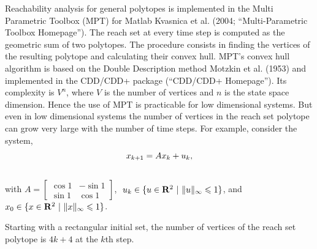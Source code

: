 \documentclass[letterpaper,10pt,english]{sphinxmanual}
\begin{document}
Reachability analysis for general polytopes is implemented in the Multi
Parametric Toolbox (MPT) for Matlab Kvasnica et al. (2004;
“Multi-Parametric Toolbox Homepage”). The reach set at every time step
is computed as the geometric sum of two polytopes. The procedure
consists in finding the vertices of the resulting polytope and
calculating their convex hull. MPT’s convex hull algorithm is based on
the Double Description method Motzkin et al. (1953) and implemented in
the CDD/CDD+ package (“CDD/CDD+ Homepage”). Its complexity is
$V^n$, where $V$ is the number of vertices and $n$ is
the state space dimension. Hence the use of MPT is practicable for low
dimensional systems. But even in low dimensional systems the number of
vertices in the reach set polytope can grow very large with the number
of time steps. For example, consider the system,
\begin{gather}
\begin{split}x_{k+1} = Ax_k + u_k ,\end{split}\notag\\\begin{split}\end{split}\notag
\end{gather}
with $A=\left[\begin{array}{cc}\cos 1 & -\sin 1\\ \sin 1 & \cos 1\end{array}\right]$,
$\ u_k \in \{u\in {\bf R}^2 ~|~ \|u\|_{\infty}\leqslant1\}$,
and $x_0 \in \{x\in {\bf R}^2 ~|~ \|x\|_{\infty}\leqslant1\}$.

Starting with a rectangular initial set, the number of vertices of the
reach set polytope is $4k + 4$ at the $k$th step.
\end{document}
